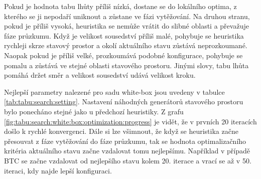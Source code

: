Pokud je hodnota tabu lhůty příliš nízká, dostane se do lokálního optima, z kterého se ji nepodaří uniknout a zůstane ve fázi vytěžování.
Na druhou stranu, pokud je příliš vysoká, heuristika se nemůže vrátit do slibné oblasti a převažuje fáze průzkumu.
Když je velikost sousedství příliš malé, pohybuje se heuristika rychleji skrze stavový prostor a okolí aktuálního stavu zůstává neprozkoumané.
Naopak pokud je příliš velké, prozkoumává podobné konfigurace, pohybuje se pomalu a zůstává ve stejné oblasti stavového prostoru.
Jinými slovy, tabu lhůta pomáhá držet směr a velikost sousedství udává velikost kroku.

Nejlepší parametry nalezené pro sadu white-box jsou uvedeny v tabulce \ref{tab:tabu:search:setting}.
Nastavení náhodných generátorů stavového prostoru bylo ponecháno stejné jako u předchozí heuristiky.
Z grafu \ref{fig:tabu:search:white:box:optimization:progress} je vidět, že v prvních 20 iteracích došlo k rychlé konvergenci.
Dále si lze všimnout, že když se heuristika začne přesouvat z fáze vytěžování do fáze průzkumu, tak se hodnota optimalizačního kritéria aktuálního stavu začne vzdalovat tomu nejlepšímu.
Například v případě BTC se začne vzdalovat od nejlepšího stavu kolem 20. iterace a vrací se až v 50. iteraci, kdy najde lepší konfiguraci.

\begin{table}[!htbp]
\centering
\caption[Nejlepší nalezené nastavení pro sadu white-box pro tabu prohledávání]{~Nejlepší nalezené nastavení pro sadu white-box pro tabu prohledávání}
\label{tab:tabu:search:setting}
\end{table}

